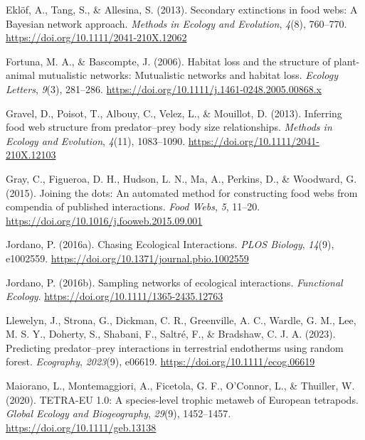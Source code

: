 \documentclass[
]{article}
\newlength{\cslhangindent}
\newenvironment{CSLReferences}[2] %
 {\begin{list}{}{%
  \setlength{\itemindent}{0pt}
  \setlength{\leftmargin}{0pt}
  \setlength{\parsep}{0pt}
  \ifodd #1
   \setlength{\leftmargin}{\cslhangindent}
   \setlength{\itemindent}{-1\cslhangindent}
  \fi
  \setlength{\itemsep}{#2\baselineskip}}}
 {\end{list}}
\begin{document}
\begin{CSLReferences}{1}{0}
Eklöf, A., Tang, S., \& Allesina, S. (2013). Secondary extinctions in
food webs: A {Bayesian} network approach. \emph{Methods in Ecology and
Evolution}, \emph{4}(8), 760--770.
\url{https://doi.org/10.1111/2041-210X.12062}

Fortuna, M. A., \& Bascompte, J. (2006). Habitat loss and the structure
of plant-animal mutualistic networks: {Mutualistic} networks and habitat
loss. \emph{Ecology Letters}, \emph{9}(3), 281--286.
\url{https://doi.org/10.1111/j.1461-0248.2005.00868.x}

Gravel, D., Poisot, T., Albouy, C., Velez, L., \& Mouillot, D. (2013).
Inferring food web structure from predator--prey body size
relationships. \emph{Methods in Ecology and Evolution}, \emph{4}(11),
1083--1090. \url{https://doi.org/10.1111/2041-210X.12103}

Gray, C., Figueroa, D. H., Hudson, L. N., Ma, A., Perkins, D., \&
Woodward, G. (2015). Joining the dots: {An} automated method for
constructing food webs from compendia of published interactions.
\emph{Food Webs}, \emph{5}, 11--20.
\url{https://doi.org/10.1016/j.fooweb.2015.09.001}

Jordano, P. (2016a). Chasing {Ecological Interactions}. \emph{PLOS
Biology}, \emph{14}(9), e1002559.
\url{https://doi.org/10.1371/journal.pbio.1002559}

Jordano, P. (2016b). Sampling networks of ecological interactions.
\emph{Functional Ecology}. \url{https://doi.org/10.1111/1365-2435.12763}

Llewelyn, J., Strona, G., Dickman, C. R., Greenville, A. C., Wardle, G.
M., Lee, M. S. Y., Doherty, S., Shabani, F., Saltré, F., \& Bradshaw, C.
J. A. (2023). Predicting predator--prey interactions in terrestrial
endotherms using random forest. \emph{Ecography}, \emph{2023}(9),
e06619. \url{https://doi.org/10.1111/ecog.06619}

Maiorano, L., Montemaggiori, A., Ficetola, G. F., O'Connor, L., \&
Thuiller, W. (2020). {TETRA-EU} 1.0: {A} species-level trophic metaweb
of {European} tetrapods. \emph{Global Ecology and Biogeography},
\emph{29}(9), 1452--1457. \url{https://doi.org/10.1111/geb.13138}


\end{CSLReferences}
\end{document}

